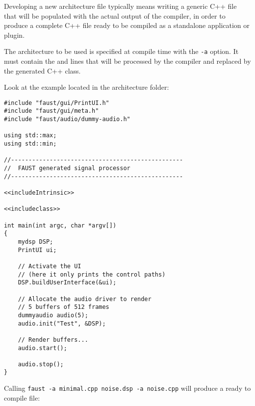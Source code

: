 Developing a new architecture file typically means writing a generic C++ file that will be populated with the actual output of the \faust compiler, in order to produce a complete C++ file ready to be compiled as a standalone application or plugin. 

The architecture to be used is specified at compile time with the \lstinline'-a' option. It must contain the  and  lines that will be processed by the \faust compiler and replaced by the generated C++ class. 

Look at the  example located in the architecture folder:

\begin{lstlisting}[basicstyle=\ttfamily\footnotesize\color{yotxt}]
#include "faust/gui/PrintUI.h"
#include "faust/gui/meta.h"
#include "faust/audio/dummy-audio.h"

using std::max;
using std::min;

//-------------------------------------------------
//  FAUST generated signal processor
//-------------------------------------------------

<<includeIntrinsic>>

<<includeclass>>

int main(int argc, char *argv[])
{
    mydsp DSP;
    PrintUI ui;
    
    // Activate the UI
    // (here it only prints the control paths)
    DSP.buildUserInterface(&ui);

    // Allocate the audio driver to render 
    // 5 buffers of 512 frames
    dummyaudio audio(5);
    audio.init("Test", &DSP);
    
    // Render buffers...
    audio.start();
    
    audio.stop();
}
\end{lstlisting} 

Calling \lstinline'faust -a minimal.cpp noise.dsp -a noise.cpp' will produce a ready to compile   file:

